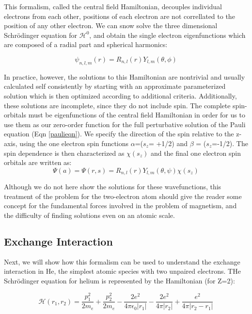 This formalism, called the central field Hamiltonian, decouples individual electrons from each other, positions of each electron are not correllated to the position of any other electron. We can snow solve the three dimensional Schr\"odinger equation for $\mathscr{H}^0$, and obtain the single electron eigenfunctions which are composed of a radial part and spherical harmonics:

\begin{equation}
\psi_{n,l,m}(r)=R_{n,l}(r)Y_{l,m}(\theta,\phi)
\end{equation}

In practice, however, the solutions to this Hamiltonian are nontrivial and usually calculated self consistently by starting with an approximate parameterized solution which is then optimized according to additional criteria. Additionally, these solutions are incomplete, since they do not include spin. The complete spin-orbitals must be eigenfunctions of the central field Hamiltonian in order for us to use them as our zero-order function for the full perturbative solution of the Pauli equation (Eqn \ref{paulieqn}). We specify the direction of the spin relative to the z-axis, using the one electron spin functions $\alpha$=($s_z$= +1/2) and $\beta$ = ($s_z$=-1/2). The spin dependence is then characterized as $\chi(s_z)$ and the final one electron spin orbitals are written as:
\begin{equation}
\Psi(a) = \Psi(r,s) = R_{n,l}(r)Y_{l,m}(\theta,\psi)\chi(s_z)
\end{equation}

Although we do not here show the solutions for these wavefunctions, this treatment of the problem for the two-electron atom should give the reader some concept for the fundamental forces involved in the problem of magnetism, and the difficulty of finding solutions even on an atomic scale.

\subsection{Exchange Interaction}
\label{exchange}
Next, we will show how this formalism can be used to understand the exchange interaction in He, the simplest atomic species with two unpaired electrons. THe Schr\"odinger equation for helium is represented by the Hamiltonian (for Z=2):

\begin{equation}
\mathscr{H}(r_1,r_2)=\frac{p^2_1}{2m_e}+\frac{p_2^2}{2m_e}-\frac{2e^2}{4\pi \epsilon_0|r_1|}-\frac{2e^2}{4\pi|r_2|}+\frac{e^2}{4\pi|r_2-r_1|}
\end{equation}

